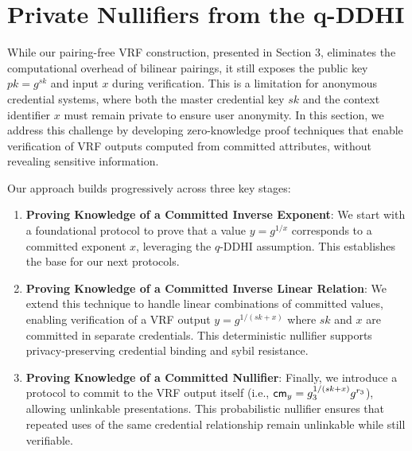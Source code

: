 






































\clearpage
\section{Private Nullifiers from the q-DDHI}\label{sec:privacy-preserving-vrf}

While our pairing-free VRF construction, presented in Section 3, eliminates the computational overhead of bilinear pairings, it still exposes the public key $pk = g^{sk}$ and input $x$ during verification. This is a limitation for anonymous credential systems, where both the master credential key $sk$ and the context identifier $x$ must remain private to ensure user anonymity. In this section, we address this challenge by developing zero-knowledge proof techniques that enable verification of VRF outputs computed from committed attributes, without revealing sensitive information.



Our approach builds progressively across three key stages:

\begin{enumerate}
    \item \textbf{Proving Knowledge of a Committed Inverse Exponent}: We start with a foundational protocol to prove that a value $y = g^{1/x}$ corresponds to a committed exponent $x$, leveraging the $q$-DDHI assumption. This establishes the base for our next protocols.

    \item \textbf{Proving Knowledge of a Committed Inverse Linear Relation}: We extend this technique to handle linear combinations of committed values, enabling verification of a VRF output $y = g^{1/(sk + x)}$ where $sk$ and $x$ are committed in separate credentials. This deterministic nullifier supports privacy-preserving credential binding and sybil resistance.

    \item \textbf{Proving Knowledge of a Committed Nullifier}: Finally, we introduce a protocol to commit to the VRF output itself (i.e., $\mathsf{cm}_y = g_3^{1/(sk + x)} g^{r_3}$), allowing unlinkable presentations. This probabilistic nullifier ensures that repeated uses of the same credential relationship remain unlinkable while still verifiable.
\end{enumerate}

